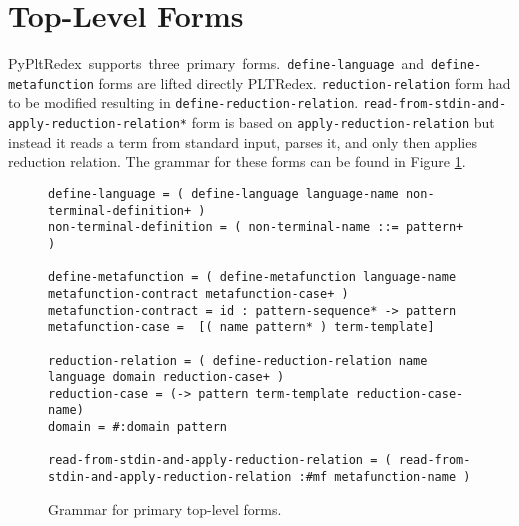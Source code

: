 \section{Top-Level Forms}

\mbox{PyPltRedex supports three primary forms. \texttt{define-language} and \texttt{define-metafunction}} forms are lifted directly PLTRedex. \texttt{reduction-relation} form had to be modified resulting in \texttt{define-reduction-relation}. \texttt{read-from-stdin-and-apply-reduction-relation*} form  is based on  \texttt{apply-reduction-relation} but instead it reads a term from standard input, parses it, and only then applies reduction relation. The grammar for these forms can be found in Figure \ref{grammar-tlmain}.

\begin{figure}
\begin{verbatim}
define-language = ( define-language language-name non-terminal-definition+ )
non-terminal-definition = ( non-terminal-name ::= pattern+ )

define-metafunction = ( define-metafunction language-name metafunction-contract metafunction-case+ )
metafunction-contract =	id : pattern-sequence* -> pattern
metafunction-case =  [( name pattern* ) term-template]

reduction-relation = ( define-reduction-relation name language domain reduction-case+ )
reduction-case = (-> pattern term-template reduction-case-name)
domain = #:domain pattern

read-from-stdin-and-apply-reduction-relation = ( read-from-stdin-and-apply-reduction-relation :#mf metafunction-name )
\end{verbatim}
\caption{Grammar for primary top-level forms.}
\label{grammar-tlmain}
\end{figure}

